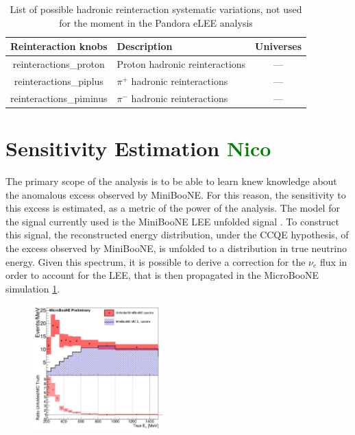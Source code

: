 \documentclass[a4paper]{article}
\newcommand{\nue}{$\nu_e$ }
\begin{document}
\begin{table}[H]
\centering
 \begin{tabular}{| c | m{6cm} | c |} 
    \hline
\hline
Reinteraction knobs & Description & Universes \\
\hline
reinteractions\_proton        &  Proton hadronic reinteractions  & ---\\ 
reinteractions\_piplus   &  $\pi^+$ hadronic reinteractions & ---\\ 
reinteractions\_piminus        & $\pi^-$ hadronic reinteractions  & ---\\ 
\hline
\end{tabular}
\caption{List of possible hadronic reinteraction systematic variations, not used for the moment in the Pandora eLEE analysis}
\label{tab:fluxsyst}
\end{table}

\newpage

\section{Sensitivity Estimation \textcolor{green}{Nico}}
\label{sec:sensitivity}
The primary scope of the analysis is to be able to learn knew knowledge about the anomalous excess observed by MiniBooNE.
For this reason, the sensitivity to this excess is estimated, as a metric of the power of the analysis.
The model for the signal currently used is the MiniBooNE LEE unfolded signal \cite{bib:sbnfit20437}.
To construct this signal, the reconstructed energy distribution, under the CCQE hypothesis, of the excess observed by MiniBooNE, is unfolded to a distribution in true neutrino energy.
Given this spectrum, it is possible to derive a correction for the \nue flux in order to account for the LEE, that is then propagated in the MicroBooNE simulation \ref{fig:lee_unfolded_signal}.

\begin{figure}[H]
    \begin{center}
    \includegraphics[width=0.45\textwidth]{Sensitivity/lee_unfolded_signal.png}
    \caption{}
    \label{fig:lee_unfolded_signal}
    \end{center}
\end{figure}
\end{document}
